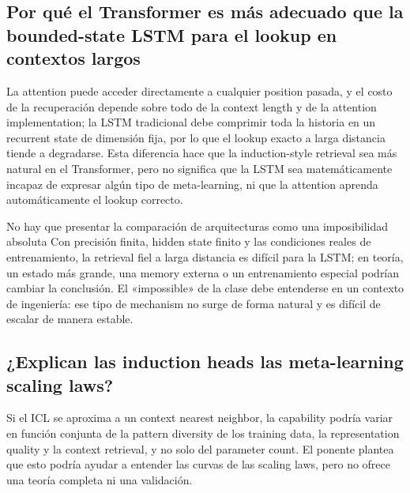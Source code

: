 \subsection{Por qué el Transformer es más adecuado que la bounded-state LSTM para el lookup en contextos largos}

La attention puede acceder directamente a cualquier position pasada, y el costo de la recuperación depende sobre todo de la context length y de la attention implementation; la LSTM tradicional debe comprimir toda la historia en un recurrent state de dimensión fija, por lo que el lookup exacto a larga distancia tiende a degradarse. Esta diferencia hace que la induction-style retrieval sea más natural en el Transformer, pero no significa que la LSTM sea matemáticamente incapaz de expresar algún tipo de meta-learning, ni que la attention aprenda automáticamente el lookup correcto.


\begin{knowledgebox}{No hay que presentar la comparación de arquitecturas como una imposibilidad absoluta}
Con precisión finita, hidden state finito y las condiciones reales de entrenamiento, la retrieval fiel a larga distancia es difícil para la LSTM; en teoría, un estado más grande, una memory externa o un entrenamiento especial podrían cambiar la conclusión. El «impossible» de la clase debe entenderse en un contexto de ingeniería: ese tipo de mechanism no surge de forma natural y es difícil de escalar de manera estable.
\end{knowledgebox}

\subsection{¿Explican las induction heads las meta-learning scaling laws?}

Si el ICL se aproxima a un context nearest neighbor, la capability podría variar en función conjunta de la pattern diversity de los training data, la representation quality y la context retrieval, y no solo del parameter count. El ponente plantea que esto podría ayudar a entender las curvas de las scaling laws, pero no ofrece una teoría completa ni una validación.


